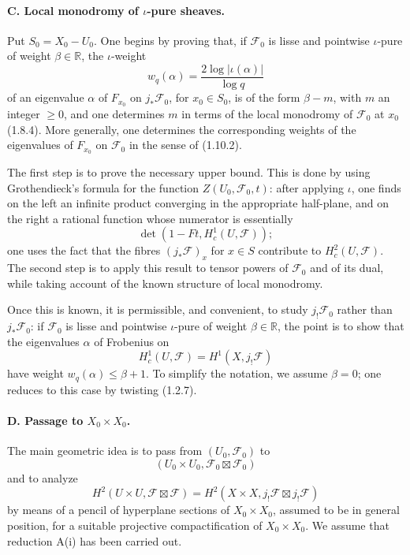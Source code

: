 \documentclass[11pt]{article}
\theoremstyle{remark}
\begin{document}
\paragraph{C. Local monodromy of $\iota$-pure sheaves.}
Put $S_0=X_0-U_0$. One begins by proving that, if $\mathcal F_0$ is lisse and pointwise $\iota$-pure of weight $\beta\in\mathbb R$, the $\iota$-weight
\[
w_q(\alpha)=\frac{2\log |\iota(\alpha)|}{\log q}
\]
of an eigenvalue $\alpha$ of $F_{x_0}$ on $j_{*}\mathcal F_0$, for $x_0\in S_0$, is of the form $\beta-m$, with $m$ an integer $\ge 0$, and one determines $m$ in terms of the local monodromy of $\mathcal F_0$ at $x_0$ (1.8.4). More generally, one determines the corresponding weights of the eigenvalues of $F_{x_0}$ on $\mathcal F_0$ in the sense of (1.10.2).

The first step is to prove the necessary upper bound. This is done by using Grothendieck's formula for the function $Z(U_0,\mathcal F_0,t)$: after applying $\iota$, one finds on the left an infinite product converging in the appropriate half-plane, and on the right a rational function whose numerator is essentially
\[
\det(1-Ft,H^1_c(U,\mathcal F));
\]
one uses the fact that the fibres $(j_{*}\mathcal F)_x$ for $x\in S$ contribute to $H^2_c(U,\mathcal F)$. The second step is to apply this result to tensor powers of $\mathcal F_0$ and of its dual, while taking account of the known structure of local monodromy.

Once this is known, it is permissible, and convenient, to study $j_{!}\mathcal F_0$ rather than $j_{*}\mathcal F_0$: if $\mathcal F_0$ is lisse and pointwise $\iota$-pure of weight $\beta\in\mathbb R$, the point is to show that the eigenvalues $\alpha$ of Frobenius on
\[
H^1_c(U,\mathcal F)=H^1(X,j_{!}\mathcal F)
\]
have weight $w_q(\alpha)\le \beta+1$. To simplify the notation, we assume $\beta=0$; one reduces to this case by twisting (1.2.7).

\paragraph{D. Passage to $X_0\times X_0$.}
The main geometric idea is to pass from $(U_0,\mathcal F_0)$ to
\[
(U_0\times U_0,\mathcal F_0\boxtimes\mathcal F_0)
\]
and to analyze
\[
H^2(U\times U,\mathcal F\boxtimes\mathcal F)
  = H^2(X\times X,j_{!}\mathcal F\boxtimes j_{!}\mathcal F)
\]
by means of a pencil of hyperplane sections of $X_0\times X_0$, assumed to be in general position, for a suitable projective compactification of $X_0\times X_0$. We assume that reduction A(i) has been carried out.
\end{document}

